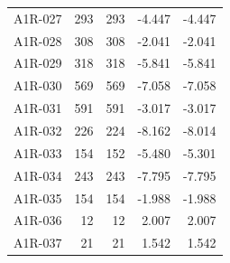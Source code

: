 \begin{longtable}{lrrrr}
A1R-027 & 293 & 293 & -4.447 & -4.447 \\
A1R-028 & 308 & 308 & -2.041 & -2.041 \\
A1R-029 & 318 & 318 & -5.841 & -5.841 \\
A1R-030 & 569 & 569 & -7.058 & -7.058 \\
A1R-031 & 591 & 591 & -3.017 & -3.017 \\
A1R-032 & 226 & 224 & -8.162 & -8.014 \\
A1R-033 & 154 & 152 & -5.480 & -5.301 \\
A1R-034 & 243 & 243 & -7.795 & -7.795 \\
A1R-035 & 154 & 154 & -1.988 & -1.988 \\
A1R-036 & 12 & 12 & 2.007 & 2.007 \\
A1R-037 & 21 & 21 & 1.542 & 1.542 \\
\bottomrule
\end{longtable}
\endgroup

